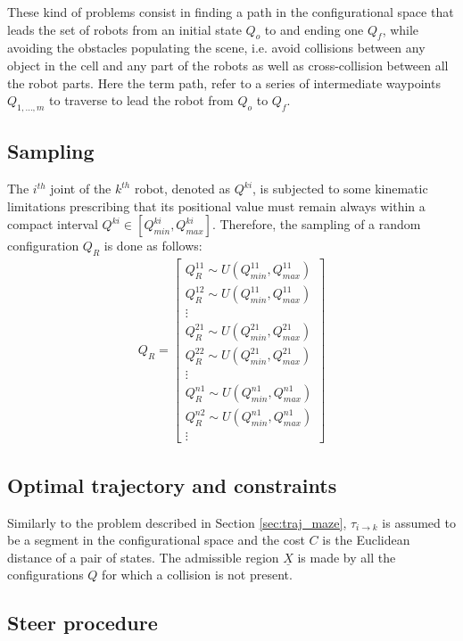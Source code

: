 These kind of problems consist in finding a path in the configurational space that leads the set of robots from an initial state $Q_o$ to and ending one $Q_f$, while avoiding the obstacles populating the scene, i.e. avoid collisions between any object in the cell and any part of the robots as well as cross-collision between all the robot parts. Here the term path, refer to a series of intermediate waypoints $Q_{1,\hdots,m}$ to traverse to lead the robot from $Q_o$ to $Q_f$. 

\subsection{Sampling}

The $i^{th}$ joint of the $k^{th}$ robot, denoted as $Q^{ki}$, is subjected to some kinematic limitations prescribing that its positional value must remain always within a compact interval $Q^{ki} \in [Q^{ki}_{min} , Q^{ki}_{max}]$. Therefore, the sampling of a random configuration $Q_R$ is done as follows:
\begin{eqnarray}
Q_R = \begin{bmatrix} 
Q^{11}_R \sim U(Q^{11}_{min},Q^{11}_{max}) \\
Q^{12}_R \sim U(Q^{11}_{min},Q^{11}_{max}) \\
\vdots \\ 
Q^{21}_R \sim U(Q^{21}_{min},Q^{21}_{max}) \\
Q^{22}_R \sim U(Q^{21}_{min},Q^{21}_{max}) \\
\vdots \\
Q^{n1}_R \sim U(Q^{n1}_{min},Q^{n1}_{max}) \\
Q^{n2}_R \sim U(Q^{n1}_{min},Q^{n1}_{max}) \\
\vdots
\end{bmatrix}
\end{eqnarray}

\subsection{Optimal trajectory and constraints}

Similarly to the problem described in Section \ref{sec:traj_maze}, $\tau_{i \rightarrow k}$ is assumed to be a segment in the configurational space and the cost $C$ is the Euclidean distance of a pair of states.
The admissible region $\underline{X}$ is made by all the configurations $Q$ for which a collision is not present.

\subsection{Steer procedure}
\label{sec:steer_articulated}

